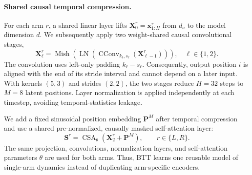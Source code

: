 \paragraph{Shared causal temporal compression.}
For each arm $r$, a shared linear layer lifts
$\mathbf{X}^{r}_{0}=\mathbf{x}^{r}_{1:H}$ from $d_a$ to the model dimension
$d$.  We subsequently apply two weight-shared causal convolutional stages,
\begin{equation}
    \mathbf{X}^{r}_{\ell}
    = \operatorname{Mish}\!\left(
        \operatorname{LN}\!\left(
        \operatorname{CConv}_{k_{\ell},s_{\ell}}
        (\mathbf{X}^{r}_{\ell-1})\right)\right),
    \quad \ell\in\{1,2\}.
    \label{eq:btt_causal_conv}
\end{equation}
The convolution uses left-only padding $k_{\ell}-s_{\ell}$.  Consequently,
output position $i$ is aligned with the end of its stride interval and cannot
depend on a later input.  With kernels $(5,3)$ and strides $(2,2)$, the two
stages reduce $H=32$ steps to $M=8$ latent positions.  Layer normalization is
applied independently at each timestep, avoiding temporal-statistics leakage.

We add a fixed sinusoidal position embedding $\mathbf{P}^{M}$ after temporal
compression and use a shared pre-normalized, causally masked self-attention
layer:
\begin{equation}
    \mathbf{S}^{r}
    = \operatorname{CSA}_{\theta}
      (\mathbf{X}^{r}_{2}+\mathbf{P}^{M}),
    \qquad r\in\{L,R\}.
    \label{eq:btt_single_arm}
\end{equation}
The same projection, convolutions, normalization layers, and self-attention
parameters $\theta$ are used for both arms.  Thus, BTT learns one reusable
model of single-arm dynamics instead of duplicating arm-specific encoders.

